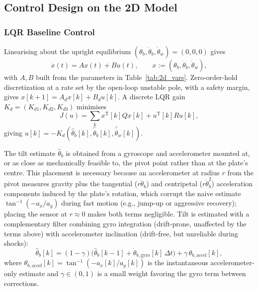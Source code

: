 \subsection{Control Design on the 2D Model}
\label{sec:control2d}

\subsubsection{LQR Baseline Control}

Linearising about the upright equilibrium $(\theta_b,\dot\theta_b,\dot\theta_w)=(0,0,0)$ gives
\begin{equation}
\dot x(t) = Ax(t) + Bu(t), \qquad x := (\theta_b,\dot\theta_b,\dot\theta_w),
\end{equation}
with $A, B$ built from the parameters in Table~\ref{tab:2d_vars}.
Zero-order-hold discretization at a rate set by the open-loop unstable pole,
with a safety margin, gives $x[k+1] = A_dx[k]+B_du[k]$. A discrete LQR gain
$K_d=(K_{d1},K_{d2},K_{d3})$ minimises
\begin{equation}
J(u) = \sum_k x^{\mathrm T}[k]Qx[k] + u^{\mathrm T}[k]Ru[k],
\end{equation}
giving $u[k]=-K_d(\hat\theta_b[k],\hat{\dot\theta}_b[k],\hat{\dot\theta}_w[k])$.

The tilt estimate $\hat\theta_b$ is obtained from a gyroscope and
accelerometer mounted at, or as close as mechanically feasible to, the pivot
point rather than at the plate's centre. This placement is necessary because
an accelerometer at radius $r$ from the pivot measures gravity plus the
tangential ($r\ddot\theta_b$) and centripetal ($r\dot\theta_b^2$) acceleration
components induced by the plate's rotation, which corrupt the naive estimate
$\tan^{-1}(-a_x/a_y)$ during fast motion (e.g., jump-up or aggressive
recovery); placing the sensor at $r\approx0$ makes both terms negligible.
Tilt is estimated with a complementary filter combining gyro integration
(drift-prone, unaffected by the terms above) with accelerometer inclination
(drift-free, but unreliable during shocks):
\begin{equation}
\hat\theta_b[k] = (1-\gamma)\big(\hat\theta_b[k-1] + \dot\theta_{b,\text{gyro}}[k]\,\Delta t\big) + \gamma\,\theta_{b,\text{accel}}[k],
\end{equation}
where $\theta_{b,\text{accel}}[k] = \tan^{-1}(-a_x[k]/a_y[k])$ is the
instantaneous accelerometer-only estimate and $\gamma\in(0,1)$ is a small
weight favoring the gyro term between corrections.

